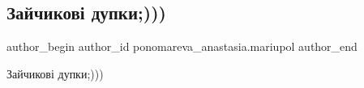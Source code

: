  
 
 
 
 

\subsection{Зайчикові дупки;)))}
\label{sec:05_05_2019.fb.ponomareva_anastasia.mariupol.2.zajchykovi_dupky}

\ifcmt
 author_begin
   author_id ponomareva_anastasia.mariupol
 author_end
\fi

Зайчикові дупки;)))

